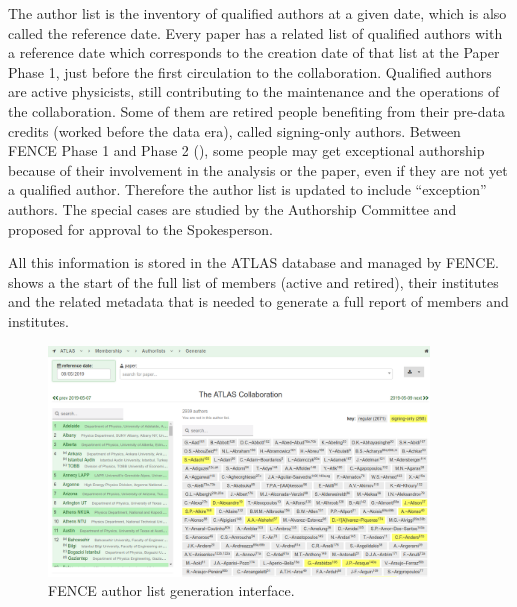 The author list is the inventory of qualified authors at a given date, which is also called the reference date. Every paper has a related list of qualified authors with a reference date which corresponds to the creation date of that list at the Paper Phase 1, just before the first circulation to the collaboration. Qualified authors are active physicists, still contributing to the maintenance and the operations of the collaboration.
Some of them are retired people benefiting from their pre-data credits (worked before the data era), called signing-only authors.
Between FENCE Phase 1 and Phase 2 (), some people may get exceptional authorship because of their involvement in the analysis or the paper,
even if they are not yet a qualified author.
Therefore the author list is updated to include \enquote{exception} authors.
The special cases are studied by the Authorship Committee and proposed for approval to the Spokesperson.

All this information is stored in the ATLAS database and managed by FENCE\@.
 shows a the start of the full list of members (active and retired), their institutes and the related metadata that is needed to generate a full report of members and institutes.

\begin{figure}[htb]
  \centering
  \includegraphics[width=0.9\textwidth]{figures/authorlist_generation.png}
  \caption{FENCE author list generation interface. }%
  \label{fig:authorlist_generation}
\end{figure}

